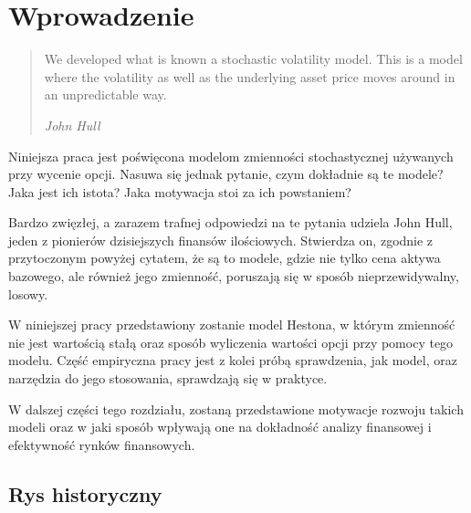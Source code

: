 \documentclass{pracamgr}
\begin{document}
\cleardoublepage
{}
{}
\tableofcontents


\chapter{Wprowadzenie}
\label{chap:introduction}
\begin{quote}

  We developed what is known a stochastic volatility model. 
  This is a model where the volatility as well as the 
  underlying asset price moves around in an unpredictable way.

\raggedleft\slshape John Hull 
\end{quote}
Niniejsza praca jest poświęcona modelom zmienności stochastycznej używanych przy wycenie opcji. 
Nasuwa się jednak pytanie, czym dokładnie są te modele? 
Jaka jest ich istota? Jaka motywacja stoi za ich powstaniem?


Bardzo zwięzłej, a zarazem trafnej odpowiedzi na te pytania udziela John Hull, 
jeden z pionierów dzisiejszych finansów ilościowych. Stwierdza on, zgodnie z przytoczonym 
powyżej cytatem, że są to modele, gdzie nie tylko cena aktywa bazowego, ale również jego zmienność, 
poruszają się w sposób nieprzewidywalny, losowy. 

W niniejszej pracy przedstawiony zostanie model Hestona, w którym zmienność nie jest wartością stałą 
oraz sposób wyliczenia wartości opcji przy pomocy tego modelu.
Część empiryczna pracy jest z kolei próbą sprawdzenia, jak model, oraz narzędzia do jego stosowania, 
sprawdzają się w praktyce.

W dalszej części tego rozdziału, zostaną przedstawione motywacje rozwoju takich modeli oraz w jaki 
sposób wpływają one na dokładność analizy finansowej i efektywność rynków finansowych. 


\section{Rys historyczny} %
\label{sec:rys_historyczny}
\end{document}
